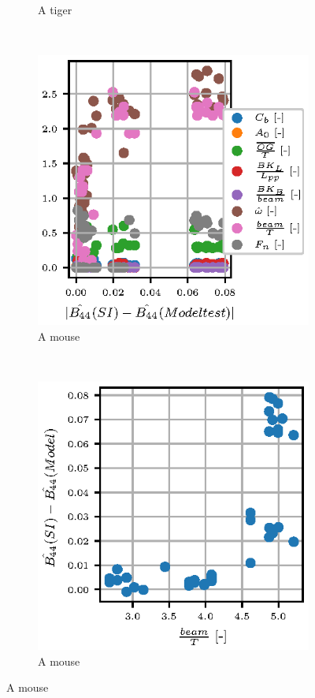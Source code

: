 \begin{figure}
\begin{subfigure}[b]{0.5\textwidth}
        \caption{A tiger}
        \label{fig:tiger}
    \end{subfigure}
    \newline
    ~ %
    \begin{subfigure}[b]{0.5\textwidth}
        \includegraphics[]{figures/parameter_residual.eps}
        \caption{A mouse}
        \label{fig:mouse}
    \end{subfigure}
    ~ %
    \begin{subfigure}[b]{0.5\textwidth}
        \includegraphics[]{figures/beam_T_residual.eps}
        \caption{A mouse}
        \label{fig:mouse}
    \end{subfigure}
    

\end{figure}
